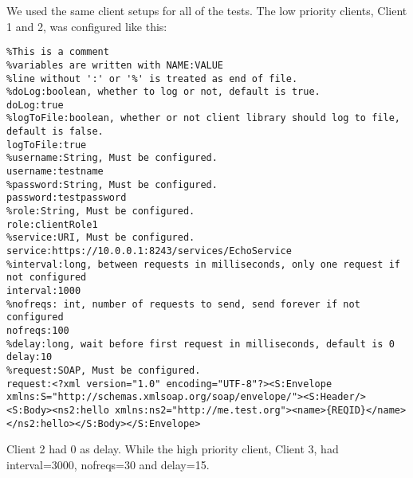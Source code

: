     We used the same client setups for all of the tests. The low priority clients, Client 1 and 2, was configured like this:
\begin{lstlisting}
%This is a comment
%variables are written with NAME:VALUE
%line without ':' or '%' is treated as end of file.
%doLog:boolean, whether to log or not, default is true.
doLog:true
%logToFile:boolean, whether or not client library should log to file, default is false.
logToFile:true
%username:String, Must be configured.
username:testname
%password:String, Must be configured.
password:testpassword
%role:String, Must be configured.
role:clientRole1
%service:URI, Must be configured.
service:https://10.0.0.1:8243/services/EchoService
%interval:long, between requests in milliseconds, only one request if not configured
interval:1000
%nofreqs: int, number of requests to send, send forever if not configured
nofreqs:100
%delay:long, wait before first request in milliseconds, default is 0
delay:10
%request:SOAP, Must be configured.
request:<?xml version="1.0" encoding="UTF-8"?><S:Envelope xmlns:S="http://schemas.xmlsoap.org/soap/envelope/"><S:Header/><S:Body><ns2:hello xmlns:ns2="http://me.test.org"><name>{REQID}</name></ns2:hello></S:Body></S:Envelope>
\end{lstlisting}
    Client 2 had 0 as delay. While the high priority client, Client 3, had interval=3000, nofreqs=30 and delay=15.
